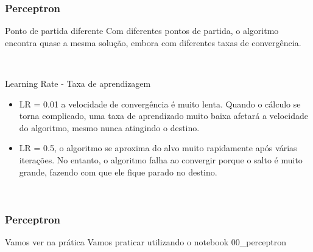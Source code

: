 \documentclass{beamer}
\begin{document}
\begin{frame}
	\frametitle{Perceptron}
	\begin{block}{Ponto de partida diferente}
		Com diferentes pontos de partida, o algoritmo encontra quase a mesma solução, embora com diferentes taxas de convergência.
		
		\href{https://github.com/mafaldasalomao/pavic_treinamento_ml/blob/main/Machine_Learning/figures/random_01.gif?raw=true}{} \\
		\href{https://github.com/mafaldasalomao/pavic_treinamento_ml/blob/main/Machine_Learning/figures/random_02.gif?raw=true}{}
	\end{block}
	\begin{block}{Learning Rate - Taxa de aprendizagem}
		\begin{itemize}
			\item LR = 0.01 a velocidade de convergência é muito lenta.
			Quando o cálculo se torna complicado, uma taxa de aprendizado muito baixa afetará a velocidade do algoritmo, mesmo nunca atingindo o destino.
			\item LR = 0.5, o algoritmo se aproxima do alvo muito rapidamente após várias iterações. No entanto, o algoritmo falha ao convergir porque o salto é muito grande, fazendo com que ele fique parado no destino.
		\end{itemize}
		\href{https://github.com/mafaldasalomao/pavic_treinamento_ml/blob/main/Machine_Learning/figures/lr_01.gif}{} \\
		\href{https://github.com/mafaldasalomao/pavic_treinamento_ml/blob/main/Machine_Learning/figures/lr_02.gif}{}
	\end{block}
\end{frame}
\begin{frame}
	\frametitle{Perceptron}
	\begin{block}{Vamos ver na prática}
		Vamos praticar utilizando o notebook 00\_perceptron
	\end{block}
\end{frame}



\end{document}
